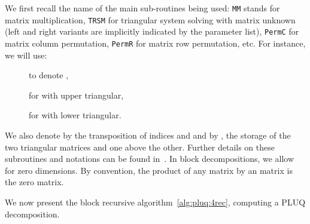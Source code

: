 \documentclass{article}
\newcommand{\strechparskip}[1]{}
\newcommand{\strechparsep}[1]{}
\newcommand{\customvspace}[1]{}
\newcommand{\trsm}{\texttt{TRSM}\xspace}
\newcommand{\MM}{\texttt{MM}\xspace}
\begin{document}
\setlength{\arraycolsep}{.8\arraycolsep}
We first  recall the name of the main sub-routines being used: \MM
stands for matrix multiplication, \trsm for triangular system solving
with matrix unknown (left and right variants are implicitly indicated
by the parameter list), \texttt{PermC} for matrix column permutation,
\texttt{PermR} for matrix row permutation, etc. For instance, we will use:
\customvspace{-12pt}
\begin{description}
\strechparskip{0pt}
\strechparsep{-1pt}
\item[] to denote ,
\item[] for  with  upper triangular,
\item[] for  with  lower triangular.
\end{description}
\customvspace{-12pt}
We  also denote by  the transposition of indices  and  and by 
, the storage of the two triangular matrices  and  one
above the other. 
Further details on these subroutines and notations can be found in~\cite{JPS:2011}.
In block decompositions, we  allow for zero dimensions. By convention,
the product of any  matrix by an  matrix is  the
 zero matrix.

We now present the block recursive algorithm~\ref{alg:pluq:4rec},
computing a PLUQ decomposition. 
\end{document}

